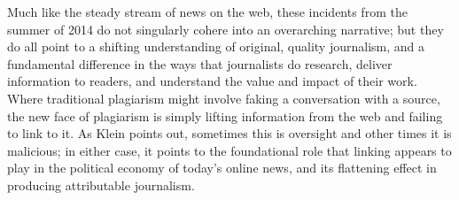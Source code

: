 Much like the steady stream of news on the web, these incidents from the summer of 2014 do not singularly cohere into an overarching narrative; but they do all point to a shifting understanding of original, quality journalism, and a fundamental difference in the ways that journalists do research, deliver information to readers, and understand the value and impact of their work. Where traditional plagiarism might involve faking a conversation with a source, the new face of plagiarism is simply lifting information from the web and failing to link to it. As Klein points out, sometimes this is oversight and other times it is malicious; in either case, it points to the foundational role that linking appears to play in the political economy of today's online news, and its flattening effect in producing attributable journalism.






